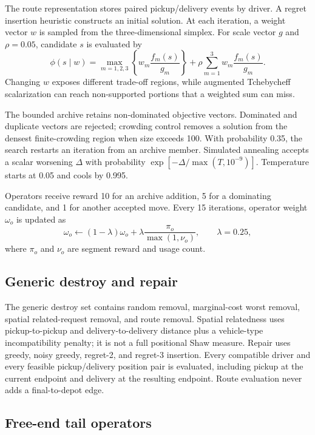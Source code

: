 \documentclass[11pt,a4paper]{article}
\begin{document}
The route representation stores paired pickup/delivery events by driver. A
regret insertion heuristic constructs an initial solution. At each iteration,
a weight vector $w$ is sampled from the three-dimensional simplex. For scale
vector $g$ and $\rho=0.05$, candidate $s$ is evaluated by
\begin{equation}
 \phi(s\mid w)=
 \max_{m=1,2,3}\left\{w_m\frac{f_m(s)}{g_m}\right\}
 +\rho\sum_{m=1}^{3}w_m\frac{f_m(s)}{g_m}.
\end{equation}
Changing $w$ exposes different trade-off regions, while augmented Tchebycheff
scalarization can reach non-supported portions that a weighted sum can miss.

The bounded archive retains non-dominated objective vectors. Dominated and
duplicate vectors are rejected; crowding control removes a solution from the
densest finite-crowding region when size exceeds 100. With probability 0.35,
the search restarts an iteration from an archive member. Simulated annealing
accepts a scalar worsening $\Delta$ with probability
$\exp[-\Delta/\max(T,10^{-9})]$. Temperature starts at 0.05 and cools by 0.995.

Operators receive reward 10 for an archive addition, 5 for a dominating
candidate, and 1 for another accepted move. Every 15 iterations, operator
weight $\omega_o$ is updated as
\begin{equation}
 \omega_o\leftarrow(1-\lambda)\omega_o+
 \lambda\frac{\pi_o}{\max(1,\nu_o)},\qquad\lambda=0.25,
\end{equation}
where $\pi_o$ and $\nu_o$ are segment reward and usage count.

\subsection{Generic destroy and repair}

The generic destroy set contains random removal, marginal-cost worst removal,
spatial related-request removal, and route removal. Spatial relatedness uses
pickup-to-pickup and delivery-to-delivery distance plus a vehicle-type
incompatibility penalty; it is not a full positional Shaw measure. Repair uses
greedy, noisy greedy, regret-2, and regret-3 insertion. Every compatible driver
and every feasible pickup/delivery position pair is evaluated, including
pickup at the current endpoint and delivery at the resulting endpoint. Route
evaluation never adds a final-to-depot edge.

\subsection{Free-end tail operators}
\end{document}

